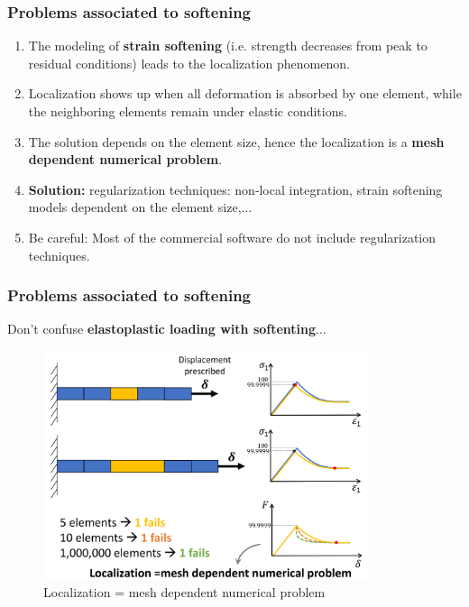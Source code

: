 \documentclass[handout]{beamer}
\begin{document}
\begin{frame}
\frametitle{Problems associated to softening}
\begin{enumerate}
	\item The modeling of \textbf{strain softening} (i.e. strength decreases from peak to residual conditions) leads to the localization
	phenomenon.
	\item Localization shows up when all deformation is absorbed by one element, while the neighboring elements remain under elastic conditions.
	\item The solution depends on the element size, hence the localization is a \textbf{mesh dependent numerical problem}.
	\item \textbf{Solution: }regularization techniques:  non‐local integration, strain softening models dependent on the element size,...
	\item Be careful: Most of the commercial software do not include regularization techniques.
\end{enumerate}
\end{frame}


\begin{frame}
\frametitle{Problems associated to softening}
Don't confuse \textbf{elastoplastic loading with softenting}...
\begin{figure}
	\includegraphics[width=0.85\textwidth]{figs/localization.png}
	\caption*{Localization = mesh dependent numerical problem}
\end{figure}
\end{frame}
\end{document}
